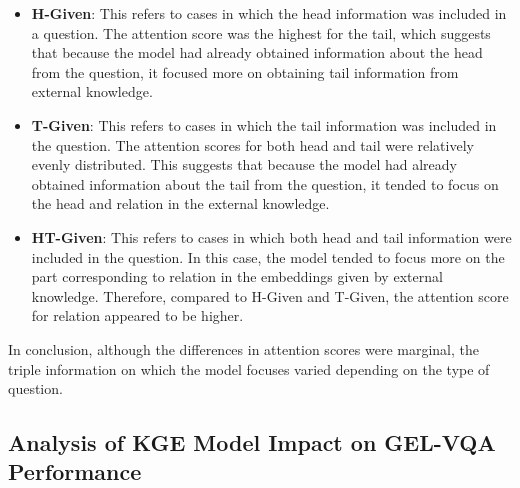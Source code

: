 \documentclass[letterpaper]{article} %
\begin{document}
\begin{itemize}
\item \textbf{H-Given}: This refers to cases in which the head information was included in a question. The attention score was the highest for the tail, which suggests that because the model had already obtained information about the head from the question, it focused more on obtaining tail information from external knowledge.
\item \textbf{T-Given}: This refers to cases in which the tail information was included in the question. The attention scores for both head and tail were relatively evenly distributed. This suggests that because the model had already obtained information about the tail from the question, it tended to focus on the head and relation in the external knowledge.

\item \textbf{HT-Given}: This refers to cases in which both head and tail information were included in the question. In this case, the model tended to focus more on the part corresponding to relation in the embeddings given by external knowledge. Therefore, compared to H-Given and T-Given, the attention score for relation appeared to be higher.
\end{itemize}

In conclusion, although the differences in attention scores were marginal, the triple information on which the model focuses varied depending on the type of question.

\subsection{Analysis of KGE Model Impact on GEL-VQA Performance}
\end{document}

